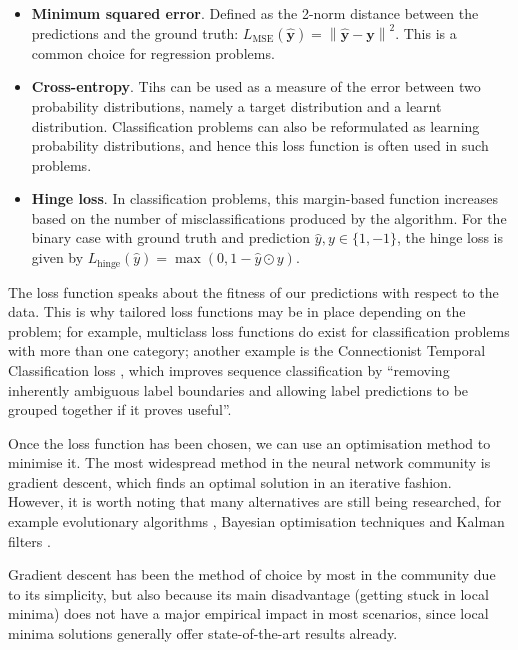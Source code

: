 \documentclass[pdftex,11pt,a4paper]{article}
\theoremstyle{definition}
\theoremstyle{remark}
\newcommand*{\V}[1]{\mathbf{#1}}%
\newcommand{\norm}[1]{\left\lVert#1\right\rVert}
\begin{document}
\begin{itemize}
    \item \textbf{Minimum squared error}. Defined as the 2-norm distance between the predictions and the ground truth: $L_\text{MSE}(\hat{\V{y}}) = \norm{\V{\hat{y}} - \V{y}}^2$. This is a common choice for regression problems.
    \item \textbf{Cross-entropy}. Tihs can be used as a measure of the error between two probability distributions, namely a target distribution and a learnt distribution. Classification problems can also be reformulated as learning probability distributions, and hence this loss function is often used in such problems.
    \item \textbf{Hinge loss}. In classification problems, this margin-based function increases based on the number of misclassifications produced by the algorithm. For the binary case with ground truth and prediction $\hat{y}, y\in\{1, -1\}$, the hinge loss is given by $L_\text{hinge}(\hat{y}) = \max{(0, 1 - \hat{y} \odot y )}$.
\end{itemize}

\par The loss function speaks about the fitness of our predictions with respect to the data. This is why tailored loss functions may be in place depending on the problem; for example, multiclass loss functions do exist for classification problems with more than one category; another example is the Connectionist Temporal Classification loss \cite{Graves2013}, which improves sequence classification by ``removing inherently ambiguous label boundaries and allowing label predictions to be grouped together if it proves useful''.

\par Once the loss function has been chosen, we can use an optimisation method to minimise it. The most widespread method in the neural network community is gradient descent, which finds an optimal solution in an iterative fashion. However, it is worth noting that many alternatives are still being researched, for example evolutionary algorithms \cite{Sexton1999,Schmidhuber2007}, Bayesian optimisation techniques \cite{DeFreitas1999} and Kalman filters \cite{Tobergte2013}.

\par Gradient descent has been the method of choice by most in the community due to its simplicity, but also because its main disadvantage (getting stuck in local minima) does not have a major empirical impact in most scenarios, since local minima solutions generally offer state-of-the-art results already.
\end{document}
